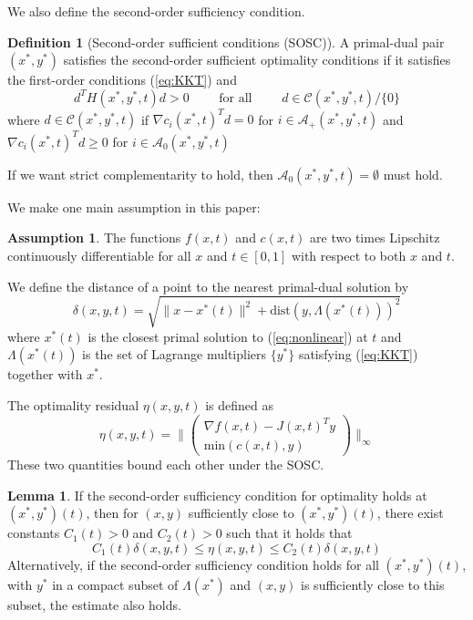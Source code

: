 \documentclass{article}
\theoremstyle{example}
\theoremstyle{definition}
\newtheorem{definition}{Definition}[section]
\theoremstyle{assumption}
\newtheorem{assumption}{Assumption}[section]
\theoremstyle{lemma}
\newtheorem{lemma}{Lemma}[section]
\begin{document}
\par
We also define the second-order sufficiency condition.
\begin{definition}[Second-order sufficient conditions (SOSC)]
	A primal-dual pair $(x^*,y^*)$ satisfies the second-order sufficient optimality conditions if it satisfies the first-order conditions (\ref{eq:KKT}) and 
	\begin{equation}
		d^TH(x^*,y^*,t)d>0\qquad \text{ for all } \qquad d\in\mathcal{C}(x^*,y^*,t)/\{0\}
	\end{equation}
where $d\in\mathcal{C}(x^*,y^*,t)$ if $\nabla c_i(x^*,t)^Td=0$ for $i\in\mathcal{A}_+(x^*,y^*,t)$ and $\nabla c_i(x^*,t)^Td\geq 0$ for $i\in\mathcal{A}_0(x^*,y^*,t)$
\end{definition}
If we want strict complementarity to hold, then $\mathcal{A}_0(x^*,y^*,t)=\emptyset$ must hold.
\par
We make one main assumption in this paper:
\begin{assumption}
	The functions $f(x,t)$ and $c(x,t)$ are two times Lipschitz continuously differentiable for all $x$ and $t\in[0,1]$ with respect to both $x$ and $t$.
\end{assumption}
\par
We define the distance of a point to the nearest primal-dual solution by 
\begin{equation*}
	\delta(x,y,t)=\sqrt{\|x-x^*(t)\|^2+\text{dist}(y,\Lambda(x^*(t)))^2}
\end{equation*}
where $x^*(t)$ is the closest primal solution to (\ref{eq:nonlinear}) at $t$ and $\Lambda(x^*(t))$ is the set of Lagrange multipliers $\{y^*\}$ satisfying (\ref{eq:KKT}) together with $x^*$.
\par
The optimality residual $\eta(x,y,t)$ is defined as
	\begin{equation*}
		\eta(x,y,t)=\bigg\| \begin{pmatrix}\nabla f(x,t)-J(x,t)^Ty\\ \text{min}(c(x,t),y) \end{pmatrix}\bigg\|_{\infty}
	\end{equation*}
These two quantities bound each other under the SOSC.
\begin{lemma}
	If the second-order sufficiency condition for optimality holds at $(x^*,y^*)(t)$, then for $(x,y)$ sufficiently close to $(x^*,y^*)(t)$, there exist constants $C_1(t)>0$ and $C_2(t)>0$ such that it holds that
	\begin{equation*}
		C_1(t)\delta(x,y,t)\leq \eta(x,y,t)\leq C_2(t)\delta(x,y,t)
	\end{equation*}
Alternatively, if the second-order sufficiency condition holds for all $(x^*,y^*)(t)$, with $y^*$ in a compact subset of $\Lambda(x^*)$ and $(x,y)$ is sufficiently close to this subset, the estimate also holds.
\end{lemma}
\end{document}
